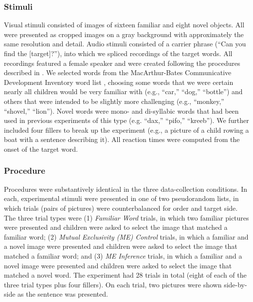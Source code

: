 \documentclass[man,noapacite]{apa2}
\begin{document}
\subsubsection{Stimuli}

Visual stimuli consisted of images of sixteen familiar and eight novel objects. All were presented as cropped images on a gray background with approximately the same resolution and detail.  Audio stimuli consisted of a carrier phrase (``Can you find the [target]?''), into which we spliced recordings of the target words. All recordings featured a female speaker and were created following the procedures described in . We selected words from the MacArthur-Bates Communicative Development Inventory word list \cite{fenson1994,fenson2007}, choosing some words that we were certain nearly all children would be very familiar with (e.g., ``car,'' ``dog,'' ``bottle'') and others that were intended to be slightly more challenging (e.g., ``monkey,'' ``shovel,'' ``lion''). Novel words were mono- and di-syllabic words that had been used in previous experiments of this type (e.g. ``dax,'' ``pifo,'' ``kreeb''). We further included four fillers to break up the experiment (e.g., a picture of a child rowing a boat with a sentence describing it). All reaction times were computed from the onset of the target word. 

\subsubsection{Procedure}

Procedures were substantively identical in the three data-collection conditions. In each, experimental stimuli were presented in one of two pseudorandom lists, in which trials (pairs of pictures) were counterbalanced for order and target side. The three trial types were (1) \emph{Familiar Word} trials, in which two familiar pictures were presented and children were asked to select the image that matched a familiar word; (2) \emph{Mutual Exclusivity (ME) Control} trials, in which a familiar and a novel image were presented and children were asked to select the image that matched a familiar word; and (3) \emph{ME Inference} trials, in which a familiar and a novel image were presented and children were asked to select the image that matched a novel word. The experiment had 28 trials in total (eight of each of the three trial types plus four fillers). On each trial, two pictures were shown side-by-side as the sentence was presented.
\end{document}
